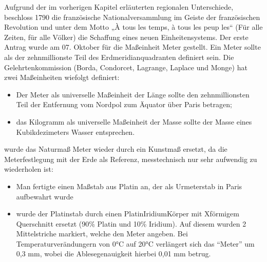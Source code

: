 \documentclass[letterpaper,10pt,english]{jupyterBook}
\begin{document}
\sphinxAtStartPar
Aufgrund der im vorherigen Kapitel erläuterten regionalen Unterschiede, beschloss 1790 die französische Nationalversammlung im Geiste der französischen Revolution und unter dem Motto „À tous les temps, à tous les peup\sphinxhyphen{} les“ (Für alle Zeiten, für alle Völker) die Schaffung eines neuen Einheitensystems.
Der erste Antrag wurde am 07. Oktober für die Maßeinheit Meter gestellt. Ein Meter sollte als der zehnmillionste Teil des Erdmeridianquadranten definiert sein. Die Gelehrtenkommission (Borda, Condorcet, Lagrange, Laplace und Monge) hat zwei Maßeinheiten wiefolgt definiert:
\begin{itemize}
\item {} 
\sphinxAtStartPar
Der Meter als universelle Maßeinheit der Länge sollte den zehnmillionsten Teil der Entfernung vom Nordpol zum Äquator über Paris betragen;

\item {} 
\sphinxAtStartPar
das Kilogramm als universelle Maßeinheit der Masse sollte der Masse eines Kubikdezimeters Wasser entsprechen.

\end{itemize}

 wurde das Naturmaß Meter wieder durch ein Kunstmaß ersetzt, da die Meterfestlegung mit der Erde als Referenz, messtechnisch nur sehr aufwendig zu wiederholen ist:
\begin{itemize}
\item {} 
\sphinxAtStartPar
Man fertigte einen Maßstab aus Platin an, der als Urmeterstab in Paris aufbewahrt wurde

\item {} 
 wurde der Platinstab durch einen Platin\sphinxhyphen{}Iridium\sphinxhyphen{}Körper mit X\sphinxhyphen{}förmigem Querschnitt ersetzt (90\% Platin und 10\% Iridium). Auf diesem wurden 2 Mittelstriche markiert, welche den Meter angeben. Bei Temperaturverändungern von 0°C auf 20°C verlängert sich das “Meter” um 0,3 mm,  wobei die Ablesegenauigkeit hierbei 0,01 mm betrug.

\end{itemize}

\sphinxAtStartPar
{}
\end{document}
